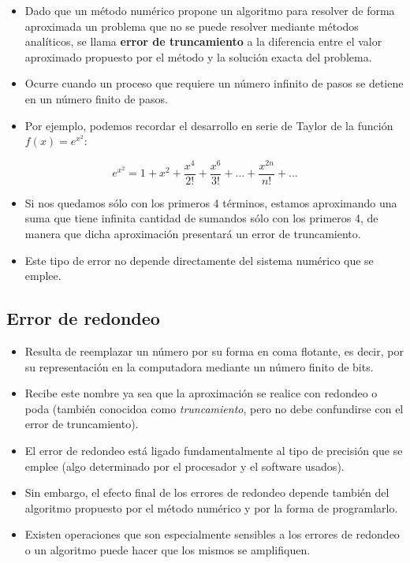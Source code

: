 \documentclass[openany]{book}
\providecommand{\tightlist}{%
  \setlength{\itemsep}{0pt}\setlength{\parskip}{0pt}}
\begin{document}
\begin{itemize}
\tightlist
\item
  Dado que un método numérico propone un algoritmo para resolver de forma aproximada un problema que no se puede resolver mediante métodos analíticos, se llama \textbf{error de truncamiento} a la diferencia entre el valor aproximado propuesto por el método y la solución exacta del problema.
\item
  Ocurre cuando un proceso que requiere un número infinito de pasos se detiene en un número finito de pasos.
\item
  Por ejemplo, podemos recordar el desarrollo en serie de Taylor de la función \(f(x) = e^{x^2}\):
\end{itemize}

\[ e^{x^2} = 1 + x^2 + \frac{x^4}{2!} + \frac{x^6}{3!} + ... + \frac{x^{2n}}{n!} + ...\]

\begin{itemize}
\tightlist
\item
  Si nos quedamos sólo con los primeros 4 términos, estamos aproximando una suma que tiene infinita cantidad de sumandos sólo con los primeros 4, de manera que dicha aproximación presentará un error de truncamiento.
\item
  Este tipo de error no depende directamente del sistema numérico que se emplee.
\end{itemize}

\hypertarget{error-de-redondeo}{%
\subsection{Error de redondeo}\label{error-de-redondeo}}

\begin{itemize}
\tightlist
\item
  Resulta de reemplazar un número por su forma en coma flotante, es decir, por su representación en la computadora mediante un número finito de bits.
\item
  Recibe este nombre ya sea que la aproximación se realice con redondeo o poda (también conocidoa como \emph{truncamiento}, pero no debe confundirse con el error de truncamiento).
\item
  El error de redondeo está ligado fundamentalmente al tipo de precisión que se emplee (algo determinado por el procesador y el software usados).
\item
  Sin embargo, el efecto final de los errores de redondeo depende también del algoritmo propuesto por el método numérico y por la forma de programlarlo.
\item
  Existen operaciones que son especialmente sensibles a los errores de redondeo o un algoritmo puede hacer que los mismos se amplifiquen.
\end{itemize}
\end{document}
